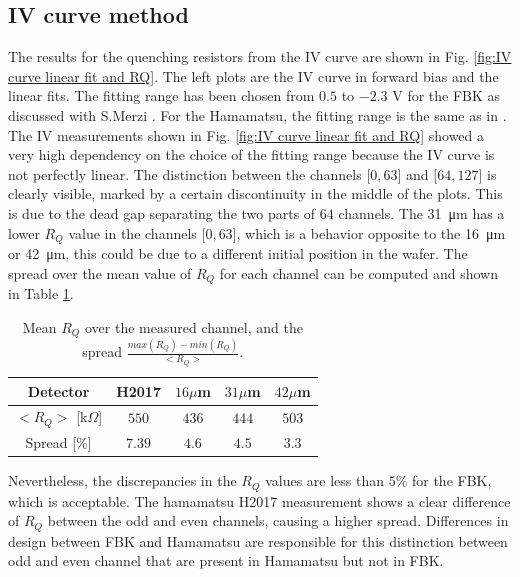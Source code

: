 \subsection{IV curve method} 
The results for the quenching resistors from the IV curve are shown in Fig. \ref{fig:IV curve linear fit and RQ}. The left plots are the IV curve in forward bias and the linear fits. The fitting range has been chosen from $0.5$ to $-2.3$ V for the FBK as discussed with S.Merzi \cite{StefanoMerzi2023PrivateCommunication}. For the Hamamatsu, the fitting range is the same as in \cite{Girard2018CharacterisationDistributions}.
The IV measurements shown in Fig. \ref{fig:IV curve linear fit and RQ} showed a very high dependency on the choice of the fitting range because the IV curve is not perfectly linear. 
The distinction between the channels [$0,63$] and [$64,127$] is clearly visible, marked by a certain discontinuity in the middle of the plots. This is due to the dead gap separating the two parts of $64$ channels. 
The \SI{31}{\micro m} has a lower $R_Q$ value in the channels  [$0,63$], which is a behavior opposite to the \SI{16}{\micro m} or \SI{42}{\micro m}, this could be due to a different initial position in the wafer. 
The spread over the mean value of $R_Q$ for each channel can be computed and shown in Table \ref{table:Rq + spread}.
\begin{table}[htbp]
\centering
\begin{tabular}{|c|c|c|c|c|}
\hline
Detector            & H2017         & $16 \mu$m     & $31 \mu$m     & $42 \mu$m     \\ \hline
$<R_Q>$ [k$\Omega$] & $550$         & $436 $        & $444 $       & $503 $ \\ \hline
Spread [\%]         & $7.39$        &  $4.6$        & $4.5$        & $3.3$          \\ \hline
\end{tabular}
\caption{Mean $R_Q$ over the measured channel, and the spread $\frac{max(R_Q)-min(R_Q)}{<R_Q>}$. }
\label{table:Rq + spread}
\end{table}
Nevertheless, the discrepancies in the $R_Q$ values are less than $5\%$ for the FBK, which is acceptable. 
The hamamatsu H2017 measurement shows a clear difference of $R_Q$ between the odd and even channels, causing a higher spread. Differences in design between FBK and Hamamatsu are responsible for this distinction between odd and even channel that are present in Hamamatsu but not in FBK.



